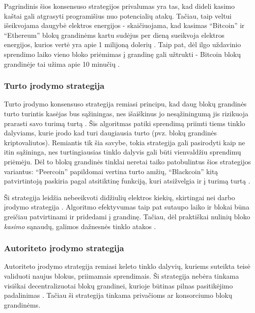 Pagrindinis šios konsensuso strategijos privalumas yra tas, kad dideli kasimo kaštai gali atgrasyti programišius nuo potencialių atakų. Tačiau,
taip veltui išeikvojama daugybė elektros energijos - skaičiuojama, kad kasimas \enquote{Bitcoin} ir \enquote{Ethereum} blokų grandinėms kartu sudėjus per dieną
sueikvoja elektros energijos, kurios vertė yra apie 1 milijoną dolerių \cite{Ethereum}. Taip pat, dėl ilgo uždavinio sprendimo laiko vieno bloko priėmimas į grandinę
gali užtrukti - Bitcoin blokų grandinėje tai užima apie 10 minučių \cite{Zheng2017}.

\subsubsection{Turto įrodymo strategija}

Turto įrodymo konsensuso strategija remiasi principu, kad daug blokų grandinės turto turintis kasėjas
bus sąžiningas, nes išaiškinus jo nesąžiningumą jis rizikuoja prarasti savo turimą turtą \cite{Baars2016}. Šis algoritmas patiki sprendimą priimti
tiems tinklo dalyviams, kurie įrodo kad turi daugiausia turto (pvz. blokų grandinės kriptovaliutos). Remiantis tik šia savybe, tokia strategija gali pasirodyti kaip ne itin sąžininga,
nes turtingiausias tinklo dalyvis gali būti vienvaldžiu sprendimų priėmėju. Dėl to blokų grandinės tinklai neretai taiko patobulintus šios strategijos
variantus: \enquote{Peercoin} papildomai vertina turto amžių, \enquote{Blackcoin} kitą patvirtintoją paskiria pagal atsitiktinę funkciją, kuri atsižvelgia ir į turimą turtą \cite{Zheng2017}.

Ši strategija leidžia nebeeikvoti didžiulių elektros kiekių, skirtingai nei darbo įrodymo strategija \cite{Ethereum}. Algoritmo efektyvumas
taip pat sutaupo laiko ir blokai būna greičiau patvirtinami ir pridedami į grandinę. Tačiau, dėl praktiškai nulinių bloko \textit{kasimo} sąnaudų,
galimos dažnesnės tinklo atakos \cite{Zheng2017}. 

\subsubsection{Autoriteto įrodymo strategija}

Autoriteto įrodymo strategija remiasi keleto tinklo dalyvių, kuriems suteikta teisė validuoti naujus blokus, priimamais sprendimais. Ši strategija nebėra tinkama visiškai
decentralizuotai blokų grandinei, kurioje būtinas pilnas pasitikėjimo padalinimas \cite{ProofOfAuthority}. Tačiau ši strategija tinkama privačioms
ar konsorciumo blokų grandinėms.

